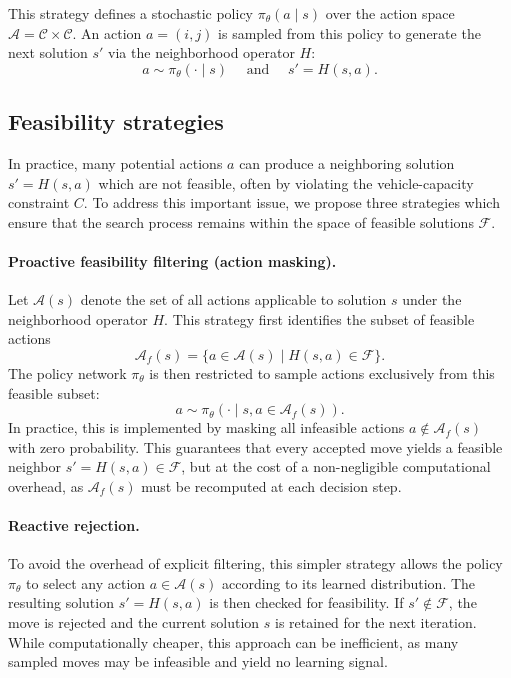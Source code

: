 \documentclass[letterpaper]{article} %
\begin{document}
This strategy defines a stochastic policy $\pi_\theta(a \mid s)$ over the action space $\mathcal{A} = \mathcal{C} \times \mathcal{C}$. An action $a = (i, j)$ is sampled from this policy to generate the next solution $s'$ via the neighborhood operator $H$:
\begin{equation}
    a \sim \pi_\theta(\cdot \mid s) \quad \text{ and } \quad s' = H(s, a). \label{eq:nhood_selection}
\end{equation}

\subsection{Feasibility strategies}


In practice, many potential actions $a$ can produce a neighboring solution $s' = H(s, a)$ which are not feasible, often by violating the vehicle-capacity constraint $C$. To address this important issue, we propose three strategies which ensure that the search process remains within the space of feasible solutions $\mathcal{F}$.

\paragraph{Proactive feasibility filtering (action masking).} 
Let $\mathcal{A}(s)$ denote the set of all actions applicable to solution $s$ under the neighborhood operator $H$.
This strategy first identifies the subset of feasible actions
\begin{equation*}
\mathcal{A}_f(s) = \{ a \in \mathcal{A}(s) \mid H(s, a) \in \mathcal{F} \}.
\end{equation*}
The policy network $\pi_\theta$ is then restricted to sample actions exclusively from this feasible subset:
\begin{equation*}
a \sim \pi_\theta(\cdot \mid s, a \in \mathcal{A}_f(s)).
\end{equation*}
In practice, this is implemented by masking all infeasible actions $a \notin \mathcal{A}_f(s)$ with zero probability. This guarantees that every accepted move yields a feasible neighbor $s' = H(s, a) \in \mathcal{F}$, but at the cost of a non-negligible computational overhead, as $\mathcal{A}_f(s)$ must be recomputed at each decision step.

\paragraph{Reactive rejection.} 
To avoid the overhead of explicit filtering, this simpler strategy allows the policy $\pi_\theta$ to select any action $a \in \mathcal{A}(s)$ according to its learned distribution. The resulting solution $s' = H(s, a)$ is then checked for feasibility. 
If $s' \notin \mathcal{F}$, the move is rejected and the current solution $s$ is retained for the next iteration. While computationally cheaper, this approach can be inefficient, as many sampled moves may be infeasible and yield no learning signal.
\end{document}
